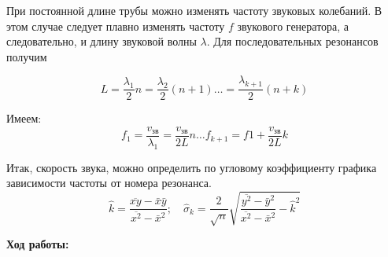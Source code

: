 \documentclass[10pt]{article}
\begin{document}
    При постоянной длине трубы можно изменять частоту звуковых колебаний. В этом случае следует плавно изменять частоту $f$ звукового генератора, а следовательно, и длину звуковой волны $\lambda$. Для последовательных резонансов получим

    \begin{equation}
        L = \frac{\lambda_1}{2} n =  \frac{\lambda_2}{2} (n+1) \dots  = \frac{\lambda_{k+1}}{2} (n+k)
    \end{equation}
    
    Имеем:
    \begin{equation}
        f_1 = \frac{v_{\text{зв}}}{\lambda_1} = \frac{v_{\text{зв}}}{2L}n \dots f_{k+1} = f1 + \frac{v_{\text{зв}}}{2L}k
    \end{equation}

    Итак, скорость звука, можно определить по угловому коэффициенту графика зависимости частоты от номера резонанса.
     \begin{equation}
        \hat{k} = \frac{\overline{xy} - \bar{x}\bar{y}}{\overline{x^2} - \bar{x}^2} ;\quad \hat{\sigma}_k = \frac{2}{\sqrt{n}}\sqrt{\frac{\overline{y^2} - \bar{y}^2}{\overline{x^2} - \bar{x}^2} - \hat{k}^2}
    \end{equation}

    \textbf{Ход работы:}
\end{document}
